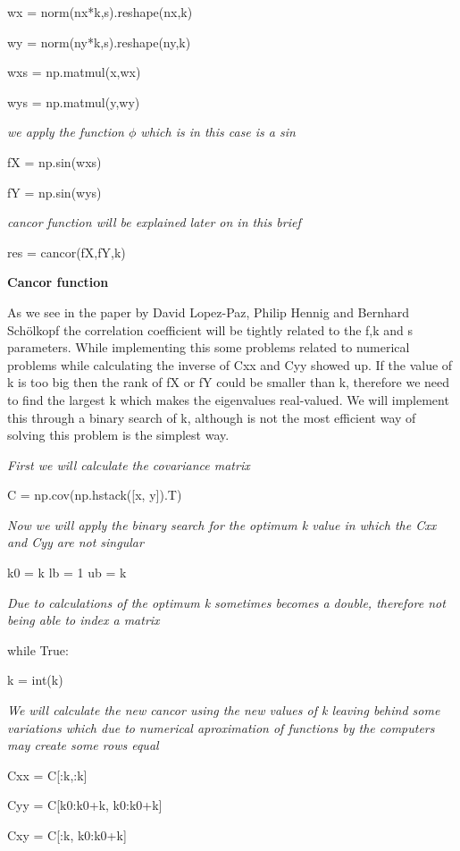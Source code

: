 \documentclass[11pt,twoside,a4paper]{article}
\begin{document}
\begin{flushleft}
	wx = norm(nx*k,s).reshape(nx,k)
	
	wy = norm(ny*k,s).reshape(ny,k)

	wxs = np.matmul(x,wx)
	
	wys = np.matmul(y,wy)
	
\textit{we apply the function $\phi$ which is in this case is a sin}

	fX = np.sin(wxs)

	fY = np.sin(wys)
	
\textit{cancor function will be explained later on in this brief}

	res = cancor(fX,fY,k)
	
\textbf{Cancor function}

As we see in the paper by David Lopez-Paz, Philip Hennig and Bernhard Schölkopf the correlation coefficient will be tightly related to the f,k and s parameters.
While implementing this some problems related to numerical problems while calculating the inverse of Cxx and Cyy showed up. If the value of k is too big then the rank of fX or fY could be smaller than k, therefore we need to find the largest k which makes the eigenvalues real-valued.
We will implement this through a binary search of k, although is not the most efficient way of solving this problem is the simplest way.


\textit{First we will calculate the covariance matrix}
	
	C = np.cov(np.hstack([x, y]).T)

\textit{Now we will apply the binary search for the optimum k value in which the Cxx and Cyy are not singular}
	
	k0 = k
	lb = 1
	ub = k

\textit{Due to calculations of the optimum k sometimes becomes a double, therefore not being able to index a matrix}

	while True:
	
	
\hspace*{50}		k = int(k)
		
\textit{We will calculate the new cancor using the new values of k leaving behind some variations which due to numerical aproximation of functions by the computers may create some rows equal}

\hspace*{50}		Cxx = C[:k,:k]

\hspace*{50}		Cyy = C[k0:k0+k, k0:k0+k]

\hspace*{50}		Cxy = C[:k, k0:k0+k]


\end{flushleft}
\end{document}
